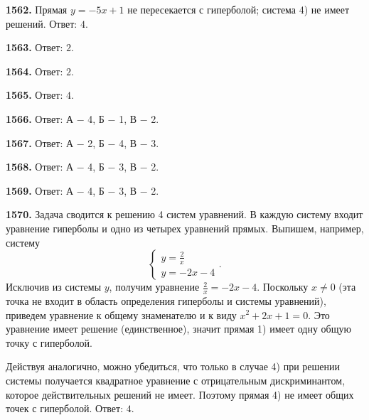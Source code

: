 \textbf{1562.}  Прямая $y=-5x+1$ не пересекается с гиперболой; система 4) не имеет решений. \newline \null \hspace*{\fill} Ответ: $4$.

\textbf{1563.} \newline \null \hspace*{\fill} Ответ: $2$.     

\textbf{1564.} \newline \null \hspace*{\fill} Ответ: $2$. 

\textbf{1565.} \newline \null \hspace*{\fill} Ответ: $4$.

\textbf{1566.} \newline \null \hspace*{\fill} Ответ:  А $-$ 4, Б $-$ 1, В $-$ 2.   

\textbf{1567.} \newline \null \hspace*{\fill} Ответ:  А $-$ 2, Б $-$ 4, В $-$ 3. 

\textbf{1568.} \newline \null \hspace*{\fill} Ответ:  А $-$ 4, Б $-$ 3, В $-$ 2.   

\textbf{1569.} \newline \null \hspace*{\fill} Ответ:  А $-$ 4, Б $-$ 3, В $-$ 2.  

\textbf{1570.}  Задача сводится к  решению 4 систем уравнений. В каждую систему входит уравнение гиперболы и одно из четырех уравнений прямых. Выпишем, например, систему  $$\begin{cases}
	y=\frac{2}{x}
	\\
	y=-2x-4	
\end{cases}.$$ Исключив из системы $y$, получим уравнение $\frac{2}{x}=-2x-4$. Поскольку $x\ne0$ (эта точка  не входит в область определения гиперболы и системы уравнений), приведем уравнение к общему знаменателю и к виду $x^2+2x+1=0$. Это уравнение имеет решение (единственное), значит прямая 1) имеет одну общую точку с гиперболой.

Действуя аналогично, можно убедиться, что только в случае 4) при решении системы получается квадратное уравнение с отрицательным дискриминантом, которое действительных решений не имеет. Поэтому прямая 4) не имеет общих точек с гиперболой. \newline \null \hspace*{\fill} Ответ: $4$.

